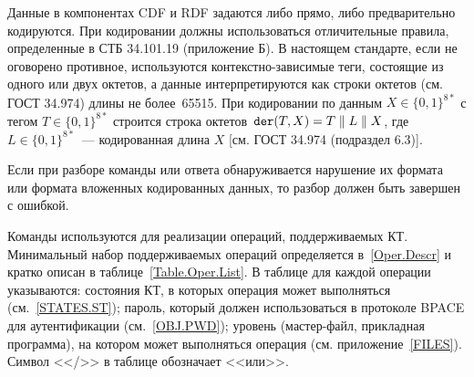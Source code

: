 Данные в компонентах CDF и RDF задаются либо прямо, либо предварительно кодируются. 
При кодировании должны использоваться отличительные правила, определенные в СТБ 34.101.19 
(приложение Б). В настоящем стандарте, если не оговорено противное, используются 
контекстно-зависимые теги, состоящие из одного или двух октетов, а данные 
интерпретируются как строки октетов (см. ГОСТ 34.974) длины не более~65515. 
При кодировании по данным $X\in\{0,1\}^{8*}$ с тегом $T\in\{0,1\}^{8*}$ строится 
строка октетов~$\texttt{der}(T, X) = T \parallel L \parallel X$, 
где $L\in\{0,1\}^{8*}$~--- кодированная длина $X$ [см. ГОСТ 34.974 (подраздел 
6.3)].  

Если при разборе команды или ответа обнаруживается нарушение их 
формата или формата вложенных кодированных данных, то разбор 
должен быть завершен с ошибкой. 

Команды используются для реализации операций, поддерживаемых КТ.
Минимальный набор поддерживаемых операций определяется в~\ref{Oper.Descr}
и кратко описан в таблице~\ref{Table.Oper.List}. 
%
В таблице для каждой операции указываются: состояния КТ, 
в которых операция может выполняться (см.~\ref{STATES.ST});
пароль, который должен использоваться 
в протоколе BPACE для аутентификации (см.~\ref{OBJ.PWD}); 
уровень (мастер-файл, прикладная программа), 
на котором может выполняться операция 
(см. приложение~\ref{FILES}).
Символ <</>> в таблице обозначает <<или>>.


